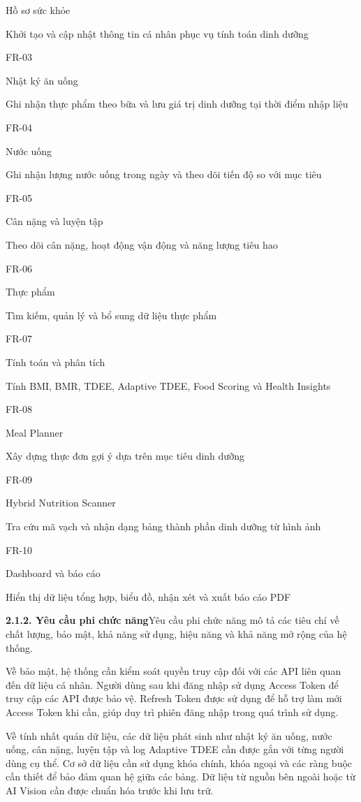 Hồ sơ sức khỏe

Khởi tạo và cập nhật thông tin cá nhân phục vụ tính toán dinh dưỡng

FR-03

Nhật ký ăn uống

Ghi nhận thực phẩm theo bữa và lưu giá trị dinh dưỡng tại thời điểm nhập liệu

FR-04

Nước uống

Ghi nhận lượng nước uống trong ngày và theo dõi tiến độ so với mục tiêu

FR-05

Cân nặng và luyện tập

Theo dõi cân nặng, hoạt động vận động và năng lượng tiêu hao

FR-06

Thực phẩm

Tìm kiếm, quản lý và bổ sung dữ liệu thực phẩm

FR-07

Tính toán và phân tích

Tính BMI, BMR, TDEE, Adaptive TDEE, Food Scoring và Health Insights

FR-08

Meal Planner

Xây dựng thực đơn gợi ý dựa trên mục tiêu dinh dưỡng

FR-09

Hybrid Nutrition Scanner

Tra cứu mã vạch và nhận dạng bảng thành phần dinh dưỡng từ hình ảnh

FR-10

Dashboard và báo cáo

Hiển thị dữ liệu tổng hợp, biểu đồ, nhận xét và xuất báo cáo PDF

\textbf{2.1.2. Yêu cầu phi chức năng}Yêu cầu phi chức năng mô tả các tiêu chí về chất lượng, bảo mật, khả năng sử dụng, hiệu năng và khả năng mở rộng của hệ thống.

Về bảo mật, hệ thống cần kiểm soát quyền truy cập đối với các API liên quan đến dữ liệu cá nhân. Người dùng sau khi đăng nhập sử dụng Access Token để truy cập các API được bảo vệ. Refresh Token được sử dụng để hỗ trợ làm mới Access Token khi cần, giúp duy trì phiên đăng nhập trong quá trình sử dụng.

Về tính nhất quán dữ liệu, các dữ liệu phát sinh như nhật ký ăn uống, nước uống, cân nặng, luyện tập và log Adaptive TDEE cần được gắn với từng người dùng cụ thể. Cơ sở dữ liệu cần sử dụng khóa chính, khóa ngoại và các ràng buộc cần thiết để bảo đảm quan hệ giữa các bảng. Dữ liệu từ nguồn bên ngoài hoặc từ AI Vision cần được chuẩn hóa trước khi lưu trữ.

